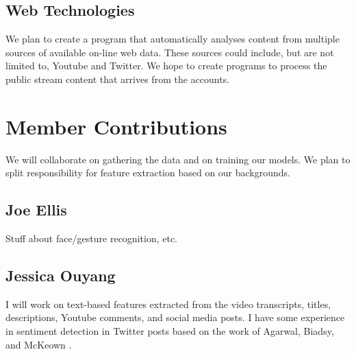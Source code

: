 \documentclass[paper=a4, fontsize=11pt]{scrartcl} %
\begin{document}
\subsection{Web Technologies}
We plan to create a program that automatically analyses content from multiple sources of available on-line web data.
These sources could include, but are not limited to, Youtube and Twitter.
We hope to create programs to process the public stream content that arrives from the accounts.

\section{Member Contributions}

We will collaborate on gathering the data and on training our models.  We plan to split responsibility for feature extraction based on our backgrounds.

\subsection{Joe Ellis}
{\color{red} Stuff about face/gesture recognition, etc.}

\subsection{Jessica Ouyang}
I will work on text-based features extracted from the video transcripts, titles, descriptions, Youtube comments, and social media posts.  
I have some experience in sentiment detection in Twitter posts based on the work of Agarwal, Biadsy, and McKeown \cite{agarwal2009contextual}.  






\end{document}
